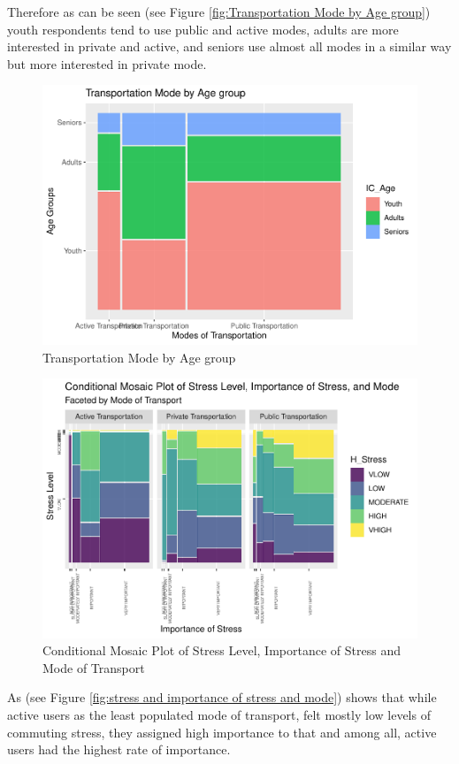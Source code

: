 \documentclass[
11pt, %
oneside, %
english, %
singlespacing, %
]{macthesis} %
\begin{document}
Therefore as can be seen (see Figure \ref{fig:Transportation Mode by Age group}) youth respondents tend to use public and active modes, adults are more interested in private and active, and seniors use almost all modes in a similar way but more interested in private mode.
\begin{figure}
\includegraphics[width=0.85\linewidth]{thesis_files/figure-latex/unnamed-chunk-27-1} \caption{\label{fig:Transportation Mode by Age group}Transportation Mode by Age group}\label{fig:unnamed-chunk-27}
\end{figure}
\begin{figure}
\includegraphics[width=0.85\linewidth]{thesis_files/figure-latex/unnamed-chunk-28-1} \caption{\label{fig:stress and importance of stress and mode}Conditional Mosaic Plot of Stress Level, Importance of Stress and Mode of Transport}\label{fig:unnamed-chunk-28}
\end{figure}
As (see Figure \ref{fig:stress and importance of stress and mode}) shows that while active users as the least populated mode of transport, felt mostly low levels of commuting stress, they assigned high importance to that and among all, active users had the highest rate of importance.
\end{document}
